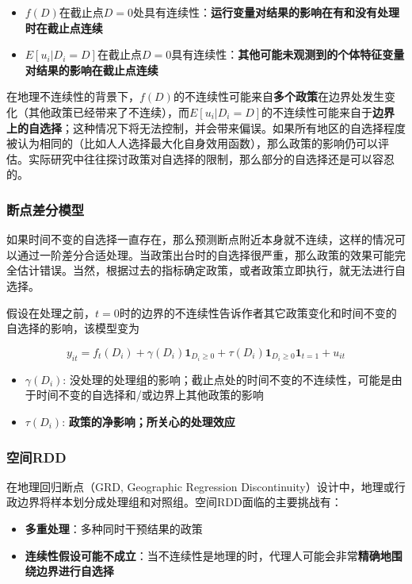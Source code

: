 \documentclass[11pt,a4paper]{ctexart}
\begin{document}
\begin{itemize}
\item
  \(f(D)\)在截止点\(D=0\)处具有连续性：\textbf{运行变量对结果的影响在有和没有处理时在截止点连续}
\item
  \(E[u_i|D_i=D]\)在截止点\(D=0\)具有连续性：\textbf{其他可能未观测到的个体特征变量对结果的影响在截止点连续}
\end{itemize}

在地理不连续性的背景下，\(f(D)\)的不连续性可能来自\textbf{多个政策}在边界处发生变化（其他政策已经带来了不连续），而\(E[u_i|D_i=D]\)的不连续性可能来自于\textbf{边界上的自选择}；这种情况下将无法控制，并会带来偏误。如果所有地区的自选择程度被认为相同的（比如人人选择最大化自身效用函数），那么政策的影响仍可以评估。实际研究中往往探讨政策对自选择的限制，那么部分的自选择还是可以容忍的。

\subsubsection{断点差分模型}

如果时间不变的自选择一直存在，那么预测断点附近本身就不连续，这样的情况可以通过一阶差分合适处理。当政策出台时的自选择很严重，那么政策的效果可能完全估计错误。当然，根据过去的指标确定政策，或者政策立即执行，就无法进行自选择。

假设在处理之前，\(t=0\)时的边界的不连续性告诉作者其它政策变化和时间不变的自选择的影响，该模型变为

\[y_{it}=f_t(D_i)+\gamma(D_i)\boldsymbol1_{D_i\ge 0}+\tau(D_i)\boldsymbol1_{D_i\ge 0}\boldsymbol1_{t=1}+u_{it}\]

\begin{itemize}
\item
  \(\gamma(D_i)\):
  没处理的处理组的影响；截止点处的时间不变的不连续性，可能是由于时间不变的自选择和/或边界上其他政策的影响
\item
  \(\tau(D_i)\): \textbf{政策的净影响；所关心的处理效应}
\end{itemize}

\subsubsection{空间RDD}

在地理回归断点（GRD, Geographic Regression
Discontinuity）设计中，地理或行政边界将样本划分成处理组和对照组。空间RDD面临的主要挑战有：

\begin{itemize}
\item
  \textbf{多重处理}：多种同时干预结果的政策
\item
  \textbf{连续性假设可能不成立}：当不连续性是地理的时，代理人可能会非常\textbf{精确地围绕边界进行自选择}
\end{itemize}
\end{document}
